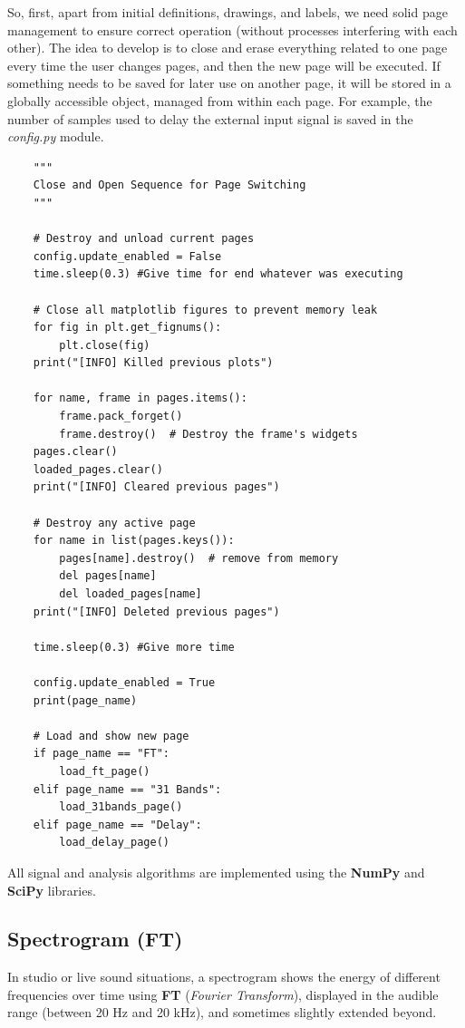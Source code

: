 So, first, apart from initial definitions, drawings, and labels, we need solid page management to ensure correct operation (without processes interfering with each other). The idea to develop is to close and erase everything related to one page every time the user changes pages, and then the new page will be executed. If something needs to be saved for later use on another page, it will be stored in a globally accessible object, managed from within each page. For example, the number of samples used to delay the external input signal is saved in the \textit{config.py} module.

\begin{verbatim}
	"""
	Close and Open Sequence for Page Switching
	"""
	
	# Destroy and unload current pages
	config.update_enabled = False
	time.sleep(0.3) #Give time for end whatever was executing
	
	# Close all matplotlib figures to prevent memory leak
	for fig in plt.get_fignums():
		plt.close(fig)
	print("[INFO] Killed previous plots")
	
	for name, frame in pages.items():
		frame.pack_forget()
		frame.destroy()  # Destroy the frame's widgets
	pages.clear()
	loaded_pages.clear()
	print("[INFO] Cleared previous pages")
	
	# Destroy any active page
	for name in list(pages.keys()):
		pages[name].destroy()  # remove from memory
		del pages[name]
		del loaded_pages[name]
	print("[INFO] Deleted previous pages")
	
	time.sleep(0.3) #Give more time
	
	config.update_enabled = True
	print(page_name)
	
	# Load and show new page
	if page_name == "FT":
		load_ft_page()
	elif page_name == "31 Bands":
		load_31bands_page()
	elif page_name == "Delay":
		load_delay_page()
\end{verbatim}

All signal and analysis algorithms are implemented using the \textbf{NumPy}\cite{numpy} and \textbf{SciPy}\cite{scipy_signal} libraries.

\subsection{Spectrogram (FT)}

In studio or live sound situations, a spectrogram shows the energy of different frequencies over time using \textbf{FT} (\textit{Fourier Transform}), displayed in the audible range (between 20 Hz and 20 kHz), and sometimes slightly extended beyond.

